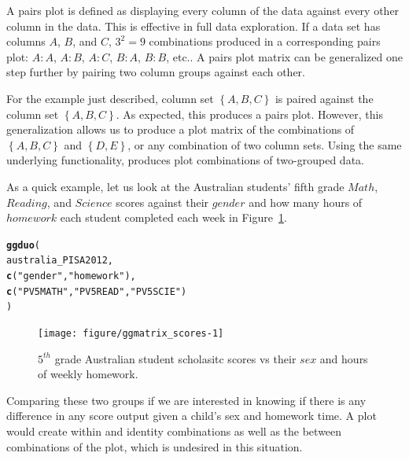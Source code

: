 \documentclass[stat,dissertation]{puthesis}\usepackage[]{graphicx}\usepackage{xcolor}
\makeatletter
\newcommand{\hlstr}[1]{\textcolor[rgb]{0.192,0.494,0.8}{#1}}%
\newcommand{\hlstd}[1]{\textcolor[rgb]{0.345,0.345,0.345}{#1}}%
\newcommand{\hlkwd}[1]{\textcolor[rgb]{0.737,0.353,0.396}{\textbf{#1}}}%
\newenvironment{kframe}{%
 \def\at@end@of@kframe{}%
 \ifinner\ifhmode%
  \def\at@end@of@kframe{\end{minipage}}%
  \begin{minipage}{\columnwidth}%
 \fi\fi%
 \def\FrameCommand##1{\hskip\@totalleftmargin \hskip-\fboxsep
 \colorbox{shadecolor}{##1}\hskip-\fboxsep
     \hskip-\linewidth \hskip-\@totalleftmargin \hskip\columnwidth}%
 \MakeFramed {\advance\hsize-\width
   \@totalleftmargin\z@ \linewidth\hsize
   \@setminipage}}%
 {\par\unskip\endMakeFramed%
 \at@end@of@kframe}
\newenvironment{knitrout}{}{} %
\renewenvironment{knitrout}{\setstretch{1}}{}
\makeatother
\begin{document}
A pairs plot is defined as displaying every column of the data against every other column in the data.  This is effective in full data exploration.  If a data set has columns $A$, $B$, and $C$, $3^2 = 9$ combinations produced in a corresponding pairs plot: $A:A$, $A:B$, $A:C$, $B:A$, $B:B$, etc.. A pairs plot matrix can be generalized one step further by pairing two column groups against each other.

For the example just described, column set $\left\{ A, B, C\right\}$ is paired against the column set $\left\{ A, B, C\right\}$.  As expected, this produces a pairs plot.  However, this generalization allows us to produce a plot matrix of the combinations of $\left\{ A, B, C\right\}$ and $\left\{ D, E\right\}$, or any combination of two column sets.  Using the same underlying  functionality,  produces plot combinations of two-grouped data.

As a quick example, let us look at the Australian students' fifth grade $Math$, $Reading$, and $Science$ scores against their $gender$ and how many hours of $homework$ each student completed each week in Figure~\ref{fig:ggmatrix_scores}.

\begin{knitrout}\small
{}\color{fgcolor}\begin{kframe}
\begin{alltt}
\hlkwd{ggduo}\hlstd{(}
  \hlstd{australia_PISA2012,}
  \hlkwd{c}\hlstd{(}\hlstr{"gender"}\hlstd{,} \hlstr{"homework"}\hlstd{),}
  \hlkwd{c}\hlstd{(}\hlstr{"PV5MATH"}\hlstd{,} \hlstr{"PV5READ"}\hlstd{,} \hlstr{"PV5SCIE"}\hlstd{)}
\hlstd{)}
\end{alltt}
\end{kframe}\begin{figure}[H]

{\centering \texttt{[image: figure/ggmatrix\_scores-1]} 

}

\caption{$5^{th}$ grade Australian student scholasitc scores vs their $sex$ and hours of weekly homework.}\label{fig:ggmatrix_scores}
\end{figure}


\end{knitrout}

Comparing these two groups if we are interested in knowing if there is any difference in any score output given a child's sex and homework time.  A  plot would create within and identity combinations as well as the between combinations of the  plot, which is undesired in this situation.
\end{document}
